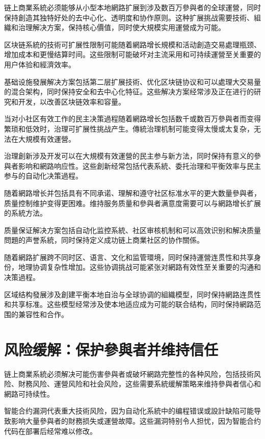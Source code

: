 \documentclass[
  Letterpaper,
]{scrbook}
\begin{document}
链上商業系統必须能够从小型本地網路扩展到涉及数百万參與者的全球運營，同时保持創造其独特好处的去中心化、透明度和协作原则。这种扩展挑战需要技術、組織和治理解决方案，保持核心價值，同时使大規模实用運營成为可能。

区块链系統的技術可扩展性限制可能随着網路增长規模和活动創造交易處理瓶颈、增加成本和更慢结算时间。这些限制可能破坏对主流采用和可持续運營至关重要的用户体验和經濟效率。

基础设施發展解决方案包括第二层扩展技術、优化区块链协议和可以處理大交易量的混合架构，同时保持安全和去中心化特征。这些解决方案经常涉及正在进行的研究和开发，以改善区块链效率和容量。

当对小社区有效工作的民主决策過程随着網路增长包括数千或数百万參與者而变得繁琐和低效时，治理可扩展性挑战产生。傳統治理机制可能变得太慢或太复杂，无法在大規模有效運營。

治理創新涉及开发可以在大規模有效運營的民主参与新方法，同时保持有意义的參與者影响和網路响应性。这些創新经常包括代表系統、委托治理和平衡效率与民主参与的自动化决策過程。

随着網路增长并包括具有不同承诺、理解和遵守社区标准水平的更大数量參與者，质量控制维护变得更困难。维持服务质量和參與者满意度需要可以与網路增长扩展的系統方法。

质量保证解决方案包括自动化监控系統、社区审核机制和可以高效识别和解决质量問題的声誉系統，同时保持定义成功链上商業社区的协作關係。

随着網路扩展跨不同时区、语言、文化和监管環境，同时保持運營连贯性和共享身份，地理协调复杂性增加。这些协调挑战可能紧张对網路有效性至关重要的沟通和决策過程。

区域结构發展涉及創建平衡本地自治与全球协调的組織模型，同时保持網路连贯性和共享标准。这些模型经常涉及使本地适应成为可能的联合结构，同时保持網路范围的兼容性和合作。

\section{风险缓解：保护參與者并维持信任}\label{ux98ceux9669ux7f13ux89e3ux4fddux62a4ux53c3ux8207ux8005ux5e76ux7ef4ux6301ux4fe1ux4efb}

链上商業系統必须解决可能伤害參與者或破坏網路完整性的各种风险，包括技術风险、財務风险、運營风险和社会风险，这些需要系統缓解策略来维持參與者信心和網路可持续性。

智能合约漏洞代表重大技術风险，因为自动化系統中的编程错误或設計缺陷可能导致影响大量參與者的財務损失或運營故障。这些漏洞特别令人担忧，因为智能合约代码在部署后经常难以修改。
\end{document}
